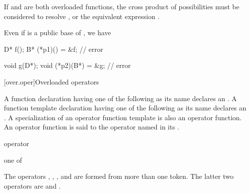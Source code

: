 \pnum
\begin{note}
If
and
are both overloaded functions, the
cross product of possibilities must be considered
to resolve
,
or the equivalent expression
.
\end{note}

\pnum
{}%
\begin{note}
Even if  is a public base of ,
we have
\begin{codeblock}
D* f();
B* (*p1)() = &f;                // error

void g(D*);
void (*p2)(B*) = &g;            // error
\end{codeblock}
\end{note}

[over.oper]{Overloaded operators}%
%
%

\pnum
{}%
A function declaration having one of the following
as its name declares an
.
A function template declaration having one of the
following  as its name
declares an . A specialization
of an operator function template is also an operator function.
An operator function is said to
the operator named in its
.

\begin{bnf}
\br
     operator
\end{bnf}

\begin{bnf}
\obeyspaces
{} \textnormal{one of}\br
    \br
    \terminal{\~        !        +        -        *        /        \%        \caret{}        \&}\br
    \terminal{|        =        +=       -=       *=       /=       \%=       \caret{}=       \&=}\br
    \terminal{|=       ==       !=       <        >        <=       >=       <=>      \&\&}\br
    \terminal{||       <<       >>       <<=      >>=      ++       --       ,}\br
\end{bnf}
\begin{note}
The operators
,
,
\tcode{()},
and
\tcode{[]}
are formed from more than one token.
The latter two operators are 
and .
\end{note}
%
%

